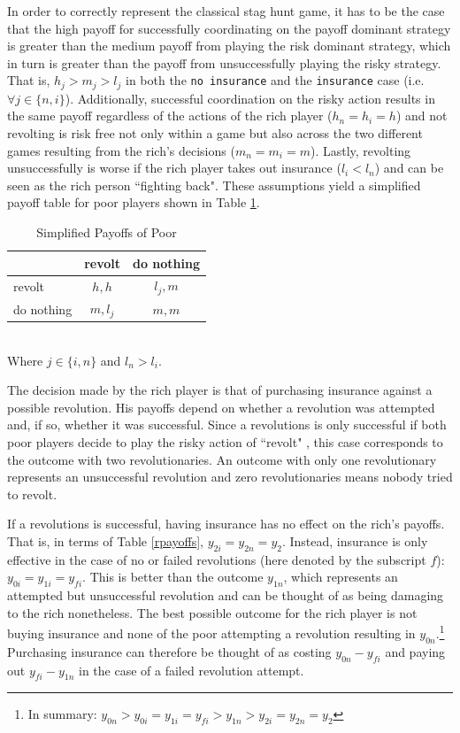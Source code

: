 \documentclass[12pt]{article}
\begin{document}
	In order to correctly represent the classical stag hunt game, it has to be 
	the case that the high payoff for successfully coordinating on the payoff 
	dominant strategy is greater than the medium payoff from 
	playing the risk dominant strategy, which in turn is greater than the 
	payoff from unsuccessfully playing the risky strategy. That is, $h_j > m_j 
	> l_j$ in both the \texttt{no insurance} and the \texttt{insurance} case 
	(i.e. $\forall j\in\{n, i\}$). Additionally, successful coordination on the 
	risky action results in the same payoff regardless of the actions of the 
	rich player ($h_n=h_i=h$) and not revolting is risk free not only within a 
	game but also across the two different games resulting from the rich's 
	decisions ($m_n=m_i=m$). Lastly, revolting unsuccessfully is worse if the 
	rich player takes out insurance ($l_i<l_n$) and can be seen as the rich 
	person ``fighting back". These assumptions yield a simplified payoff table 
	for poor players shown in Table \ref{spayoff}.
	
	\begin{table}[!htbp]
		\caption{Simplified Payoffs of Poor}
		\label{spayoff}
		\centering
		\begin{tabular}{|l|c|c|}
			\hline
			& revolt & do nothing\\
			\hline
			revolt & $h, h$ & $l_j, m$\\
			\hline
			do nothing & $m, l_j$ & $m, m$\\
			\hline
		\end{tabular}\\
		\footnotesize Where $j\in\{i, n\}$ and $l_n>l_i$.
	\end{table}
	
	The decision made by the rich player is that of purchasing insurance 
	against a possible revolution. His payoffs depend on whether a revolution 
	was attempted and, if so, whether it was successful. Since a revolutions is 
	only successful if both poor players decide to play the risky action of 
	``revolt" , this case corresponds to the outcome with two revolutionaries. 
	An outcome with only one revolutionary represents an unsuccessful 
	revolution and zero revolutionaries means nobody tried to revolt.
	
	If a revolutions is successful, having insurance has no effect on the 
	rich's payoffs. That is, in terms of Table \ref{rpayoffs}, 
	$y_{2i}=y_{2n}=y_2$. Instead, insurance is only effective in the case of no 
	or failed revolutions (here denoted by the subscript $f$): 
	$y_{0i}=y_{1i}=y_{fi}$. This is better than the outcome $y_{1n}$, which 
	represents an attempted but unsuccessful revolution and can be thought of 
	as being damaging to the rich nonetheless. The best possible outcome for 
	the rich player is not buying insurance and none of the poor attempting a 
	revolution resulting in $y_{0n}$.\footnote{In summary: $y_{0n} > 
	y_{0i}=y_{1i}=y_{fi} > y_{1n} > y_{2i}=y_{2n}=y_2$} Purchasing insurance 
	can therefore be thought of as costing $y_{0n}-y_{fi}$ and paying out 
	$y_{fi}-y_{1n}$ in the case of a failed revolution attempt.
	
\end{document}
